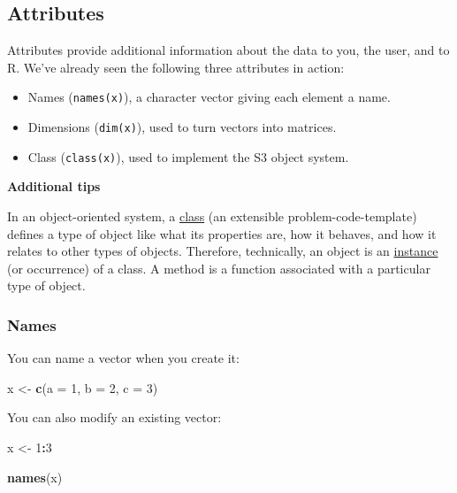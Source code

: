 \documentclass[
]{book}
\newenvironment{Shaded}{\begin{snugshade}}{\end{snugshade}}
\newcommand{\DataTypeTok}[1]{\textcolor[rgb]{0.13,0.29,0.53}{#1}}
\newcommand{\DecValTok}[1]{\textcolor[rgb]{0.00,0.00,0.81}{#1}}
\newcommand{\KeywordTok}[1]{\textcolor[rgb]{0.13,0.29,0.53}{\textbf{#1}}}
\newcommand{\NormalTok}[1]{#1}
\newcommand{\OperatorTok}[1]{\textcolor[rgb]{0.81,0.36,0.00}{\textbf{#1}}}
\newcommand{\StringTok}[1]{\textcolor[rgb]{0.31,0.60,0.02}{#1}}
\begin{document}
\hypertarget{attributes}{%
\subsection{Attributes}\label{attributes}}

Attributes provide additional information about the data to you, the user, and to R. We've already seen the following three attributes in action:

\begin{itemize}
\item
  Names (\texttt{names(x)}), a character vector giving each element a name.
\item
  Dimensions (\texttt{dim(x)}), used to turn vectors into matrices.
\item
  Class (\texttt{class(x)}), used to implement the S3 object system.
\end{itemize}

\textbf{Additional tips}

In an object-oriented system, a \href{https://www.google.com/search?q=what+is+class+programming\&oq=what+is+class+programming\&aqs=chrome.0.0l6.3543j0j4\&sourceid=chrome\&ie=UTF-8}{class} (an extensible problem-code-template) defines a type of object like what its properties are, how it behaves, and how it relates to other types of objects. Therefore, technically, an object is an \href{https://en.wikipedia.org/wiki/Instance_(computer_science)}{instance} (or occurrence) of a class. A method is a function associated with a particular type of object.

\hypertarget{names}{%
\subsubsection{Names}\label{names}}

You can name a vector when you create it:

\begin{Shaded}
\begin{Highlighting}[]
\NormalTok{x \textless{}{-}}\StringTok{ }\KeywordTok{c}\NormalTok{(}\DataTypeTok{a =} \DecValTok{1}\NormalTok{, }\DataTypeTok{b =} \DecValTok{2}\NormalTok{, }\DataTypeTok{c =} \DecValTok{3}\NormalTok{)}
\end{Highlighting}
\end{Shaded}

You can also modify an existing vector:

\begin{Shaded}
\begin{Highlighting}[]
\NormalTok{x \textless{}{-}}\StringTok{ }\DecValTok{1}\OperatorTok{:}\DecValTok{3}

\KeywordTok{names}\NormalTok{(x)}
\end{Highlighting}
\end{Shaded}
\end{document}
